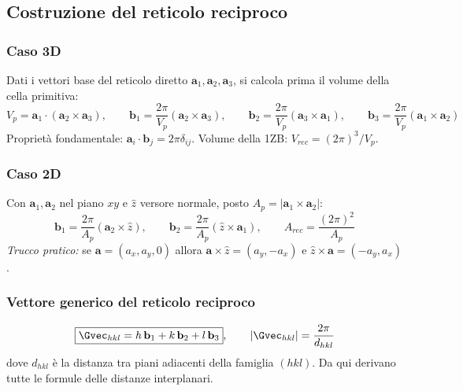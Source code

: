 \subsection{Costruzione del reticolo reciproco}
\subsubsection*{Caso 3D}
Dati i vettori base del reticolo diretto $\mathbf{a}_1, \mathbf{a}_2, \mathbf{a}_3$, si calcola prima il volume della cella primitiva:
\[ V_p = \mathbf{a}_1 \cdot (\mathbf{a}_2 \times \mathbf{a}_3), \qquad  \mathbf{b}_1 = \frac{2\pi}{V_p} (\mathbf{a}_2 \times \mathbf{a}_3), \qquad
   \mathbf{b}_2 = \frac{2\pi}{V_p} (\mathbf{a}_3 \times \mathbf{a}_1), \qquad
   \mathbf{b}_3 = \frac{2\pi}{V_p} (\mathbf{a}_1 \times \mathbf{a}_2) \]
Proprietà fondamentale: $\mathbf{a}_i \cdot \mathbf{b}_j = 2\pi\delta_{ij}$. Volume della 1ZB: $V_{rec} = (2\pi)^3/V_p$.

\subsubsection*{Caso 2D}
Con $\mathbf{a}_1, \mathbf{a}_2$ nel piano $xy$ e $\hat z$ versore normale, posto $A_p = |\mathbf{a}_1 \times \mathbf{a}_2|$:
\[ \mathbf{b}_1 = \frac{2\pi}{A_p} (\mathbf{a}_2 \times \hat z), \qquad
   \mathbf{b}_2 = \frac{2\pi}{A_p} (\hat z \times \mathbf{a}_1), \qquad A_{rec} = \frac{(2\pi)^2}{A_p} \]
\textit{Trucco pratico:} se $\mathbf{a}=(a_x,a_y,0)$ allora $\mathbf{a}\times\hat z = (a_y, -a_x)$ e $\hat z \times \mathbf{a} = (-a_y, a_x)$.

\subsubsection*{Vettore generico del reticolo reciproco}
\[ \boxed{\Gvec_{hkl} = h\,\mathbf{b}_1 + k\,\mathbf{b}_2 + l\,\mathbf{b}_3}, \qquad
   |\Gvec_{hkl}| = \frac{2\pi}{d_{hkl}} \]
dove $d_{hkl}$ è la distanza tra piani adiacenti della famiglia $(hkl)$. Da qui derivano tutte le formule delle distanze interplanari.

